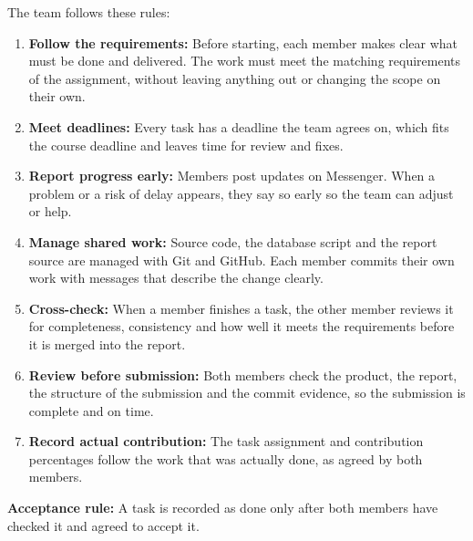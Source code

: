 The team follows these rules:

\begin{enumerate}
  \item \textbf{Follow the requirements:}
    Before starting, each member makes clear what must be done and delivered.
    The work must meet the matching requirements of the assignment, without
    leaving anything out or changing the scope on their own.

  \item \textbf{Meet deadlines:}
    Every task has a deadline the team agrees on, which fits the course
    deadline and leaves time for review and fixes.

  \item \textbf{Report progress early:}
    Members post updates on Messenger. When a problem or a risk of delay
    appears, they say so early so the team can adjust or help.

  \item \textbf{Manage shared work:}
    Source code, the database script and the report source are managed
    with Git and GitHub. Each member commits their own work with messages
    that describe the change clearly.

  \item \textbf{Cross-check:}
    When a member finishes a task, the other member reviews it for
    completeness, consistency and how well it meets the requirements
    before it is merged into the report.

  \item \textbf{Review before submission:}
    Both members check the product, the report, the structure of the
    submission and the commit evidence, so the submission is complete
    and on time.

  \item \textbf{Record actual contribution:}
    The task assignment and contribution percentages follow the work that
    was actually done, as agreed by both members.
\end{enumerate}

\noindent\textbf{Acceptance rule:}
A task is recorded as done only after both members have checked it and
agreed to accept it.
